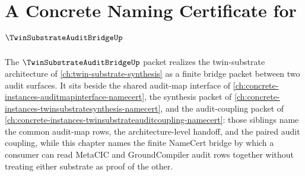 \chapter{A Concrete Naming Certificate for $\TwinSubstrateAuditBridgeUp$}
\label{ch:concrete-instances-twin-substrate-audit-bridge-namecert}

The $\TwinSubstrateAuditBridgeUp$ packet realizes the twin-substrate architecture of \autoref{ch:twin-substrate-synthesis} as a finite bridge packet between two audit surfaces. It sits beside the shared audit-map interface of \autoref{ch:concrete-instances-auditmapinterface-namecert}, the synthesis packet of \autoref{ch:concrete-instances-twinsubstratesynthesis-namecert}, and the audit-coupling packet of \autoref{ch:concrete-instances-twinsubstrateauditcoupling-namecert}: those siblings name the common audit-map rows, the architecture-level handoff, and the paired audit coupling, while this chapter names the finite NameCert bridge by which a consumer can read MetaCIC and GroundCompiler audit rows together without treating either substrate as proof of the other.

